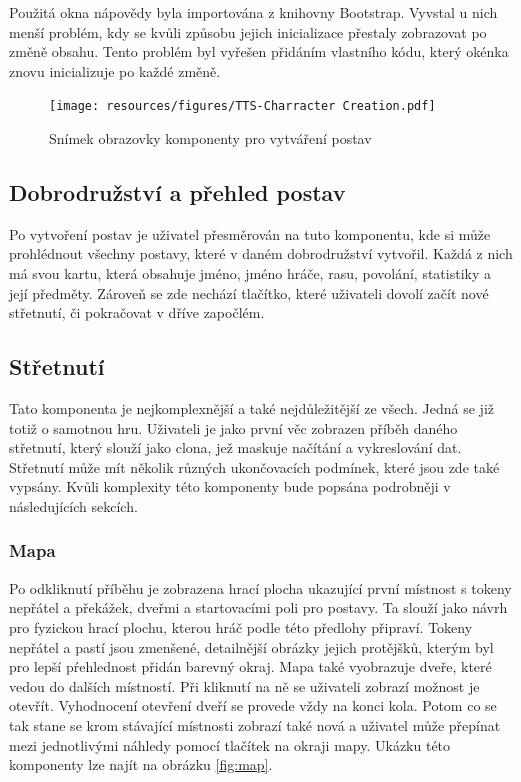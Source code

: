 Použitá okna nápovědy byla importována z knihovny Bootstrap. Vyvstal u nich menší problém, kdy se kvůli způsobu jejich inicializace přestaly zobrazovat po změně obsahu. Tento problém byl vyřešen přidáním vlastního kódu, který okénka znovu inicializuje po každé změně.

\begin{figure}[H]
  \centering
  \texttt{[image: resources/figures/TTS-Charracter Creation.pdf]}
  \caption{Snímek obrazovky komponenty pro vytváření postav}
  \label{fig:character-creation}
\end{figure}

\subsection{Dobrodružství a přehled postav}
Po vytvoření postav je uživatel přesměrován na tuto komponentu, kde si může prohlédnout všechny postavy, které v daném dobrodružství vytvořil. Každá z nich má svou kartu, která obsahuje jméno, jméno hráče, rasu, povolání, statistiky a její předměty. Zároveň se zde nechází tlačítko, které uživateli dovolí začít nové střetnutí, či pokračovat v dříve započlém.

\subsection{Střetnutí}
Tato komponenta je nejkomplexnější a také nejdůležitější ze všech. Jedná se již totiž o samotnou hru. Uživateli je jako první věc zobrazen příběh daného střetnutí, který slouží jako clona, jež maskuje načítání a vykreslování dat. Střetnutí může mít několik různých ukončovacích podmínek, které jsou zde také vypsány. Kvůli komplexity této komponenty bude popsána podrobněji v následujících sekcích.

\subsubsection*{Mapa}
Po odkliknutí příběhu je zobrazena hrací plocha ukazující první místnost s tokeny nepřátel a překážek, dveřmi a startovacími poli pro postavy. Ta slouží jako návrh pro fyzickou hrací plochu, kterou hráč podle této předlohy připraví. Tokeny nepřátel a pastí jsou zmenšené, detailnější obrázky jejich protějšků, kterým byl pro lepší pŕehlednost přidán barevný okraj. Mapa také vyobrazuje dveře, které vedou do dalších místností. Při kliknutí na ně se uživateli zobrazí možnost je otevřít. Vyhodnocení otevření dveří se provede vždy na konci kola. Potom co se tak stane se krom stávající místnosti zobrazí také nová a uživatel může přepínat mezi jednotlivými náhledy pomocí tlačítek na okraji mapy. Ukázku této komponenty lze najít na obrázku \ref{fig:map}.

